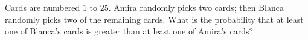 Cards are numbered $1$ to $25$. Amira randomly picks two cards; then Blanca randomly picks two of the remaining cards. What is the probability that at least one of Blanca's cards is greater than at least one of Amira's cards?
